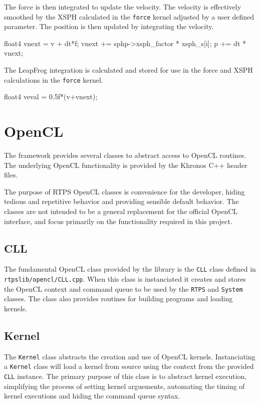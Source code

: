 The force is then integrated to update the velocity. The velocity is
effectively smoothed by the XSPH calculated in the \verb|force| kernel adjusted
by a user defined parameter. The position is then updated by integrating the
velocity.
\begin{cppcode}{0}
float4 vnext = v + dt*f;
vnext += sphp->xsph_factor * xsph_s[i];
p += dt * vnext;
\end{cppcode}

The LeapFrog integration is calculated and stored for use in the force and XSPH
calculations in the \verb|force| kernel.
\begin{cppcode}{0}
float4 veval = 0.5f*(v+vnext);
\end{cppcode}




\section{OpenCL}

The framework provides several classes to abstract access to OpenCL routines.
The underlying OpenCL functionality is provided by the Khronos C++ header
files.\cite{OpenCL} 

The purpose of RTPS OpenCL classes is convenience for the developer, hiding tedious
and repetitive behavior and providing sensible default behavior. The classes
are not intended to be a general replacement for the official OpenCL interface,
and focus primarily on the functionality required in this project.

\subsection{CLL}
The fundamental OpenCL class provided by the library is the \verb|CLL| class
defined in \verb|rtpslib/opencl/CLL.cpp|. When this class is instanciated it
creates and stores the OpenCL context and command queue to be used by the
\verb|RTPS| and \verb|System| classes. The class also provides routines for
building programs and loading kernels.

\subsection{Kernel}
The \verb|Kernel| class abstracts the creation and use of OpenCL kernels.
Instanciating a \verb|Kernel| class will load a kernel from source using the
context from the provided \verb|CLL| instance. The primary purpose of this
class is to abstract kernel execution, simplifying the process of setting
kernel arguements, automating the timing of kernel executions and hiding the
command queue syntax.


